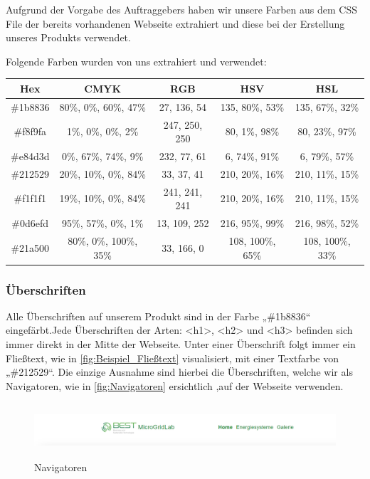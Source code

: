 Aufgrund der Vorgabe des Auftraggebers haben wir unsere Farben aus dem CSS File der bereits vorhandenen Webseite extrahiert und diese bei der Erstellung unseres Produkts verwendet.

Folgende Farben wurden von uns extrahiert und verwendet: 


\begin{tabular}{|c|c|c|c|c|}
	\hline
	 Hex & CMYK & RGB & HSV & HSL \\
	\hline
	  \#1b8836 & 80\%, 0\%, 60\%, 47\% & 27, 136, 54 & 135, 80\%, 53\% & 135, 67\%, 32\%  \\
	\hline 
	\#f8f9fa & 1\%, 0\%, 0\%, 2\% & 247, 250, 250 & 80, 1\%, 98\% & 80, 23\%, 97\% \\
	\hline
	\#e84d3d & 0\%, 67\%, 74\%, 9\% & 232, 77, 61 & 6, 74\%, 91\% & 6, 79\%, 57\% \\
	\hline
	\#212529 & 20\%, 10\%, 0\%, 84\% & 33, 37, 41 & 210, 20\%, 16\% & 210, 11\%, 15\% \\
	\hline
	\#f1f1f1 & 19\%, 10\%, 0\%, 84\% & 241, 241, 241 & 210, 20\%, 16\% & 210, 11\%, 15\% \\
	\hline
	\#0d6efd & 95\%, 57\%, 0\%, 1\% & 13, 109, 252 & 216, 95\%, 99\% & 216, 98\%, 52\% \\
	\hline
	\#21a500 & 80\%, 0\%, 100\%, 35\% & 33, 166, 0 & 108, 100\%, 65\% & 108, 100\%, 33\% \\
	\hline
	
	
\end{tabular}


\subsubsection{Überschriften}
Alle Überschriften auf unserem Produkt sind in der Farbe „\#1b8836“ eingefärbt.Jede Überschriften der Arten: <h1>, <h2> und <h3> befinden sich immer direkt in der Mitte der Webseite. 
Unter einer Überschrift folgt immer ein Fließtext, wie in \autoref{fig:Beispiel_Fließtext} visualisiert, mit einer Textfarbe von „\#212529“. Die einzige Ausnahme sind hierbei die Überschriften, welche wir als Navigatoren, wie in \autoref{fig:Navigatoren} ersichtlich ,auf der Webseite verwenden.

\begin{figure}[h]
	\centering
	\includegraphics[height=2cm,width=17cm]{images/Navigatoren}
	\caption{Navigatoren}
	\label{fig:Navigatoren}
\end{figure}

